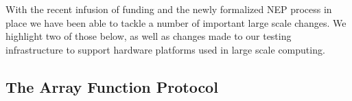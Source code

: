 



With the recent infusion of funding and the newly formalized NEP process in
place we have been able to tackle a number of important large scale changes.
We highlight two of those below, as well as changes made to our testing
infrastructure to support hardware platforms used in large scale computing.

\subsection{The Array Function Protocol}


